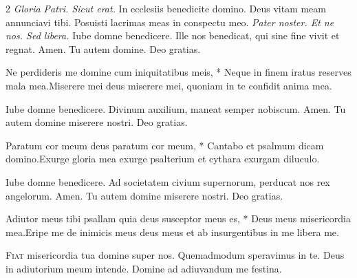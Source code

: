 \begin{multicols}{2}
\newline {}    \textit{Gloria Patri. Sicut erat.}
\newline {} In ecclesiis benedicite domino.
\newline \V Deus vitam meam annunciavi tibi. \R Posuisti lacrimas meas in conspectu meo. 
\newline \textit{Pater noster. Et ne nos. Sed libera.}
\newline {} Iube domne benedicere.
\newline {} Ille nos benedicat, qui sine fine vivit et regnat. \R Amen.
\newline {} Tu autem domine. \R Deo gratias.
\begin{responsory}[ne-perdideris]
{Ne perdideris me domine cum iniquitatibus meis, * Neque in finem iratus reserves mala mea.}{Miserere mei deus miserere mei, quoniam in te confidit anima mea.}
\end{responsory}%
\newline {} Iube domne benedicere.
\newline {} Divinum auxilium, maneat semper nobiscum. \R Amen.
\newline {} Tu autem domine miserere nostri. \R Deo gratias.
\begin{responsory}
{Paratum cor meum deus paratum cor meum, * Cantabo et psalmum dicam domino.}{Exurge gloria mea exurge psalterium et cythara exurgam diluculo.}
\end{responsory}%
\newline {} Iube domne benedicere.
\newline {} Ad societatem civium supernorum, perducat nos rex angelorum. \R Amen.
\newline {} Tu autem domine miserere nostri. \R Deo gratias.
\begin{responsory-doxology}
{Adiutor meus tibi psallam quia deus susceptor meus es, * Deus meus misericordia mea.}{Eripe me de inimicis meus deus meus et ab insurgentibus in me libera me.}
\end{responsory-doxology}%
\newline {}
\lettrine[lines=2]{\zallmancaps \color{Red} F}{iat} misericordia tua domine super nos. \R Quemadmodum speravimus in te. \V Deus in adiutorium meum intende. \R Domine ad adiuvandum me festina. 

\end{multicols}
